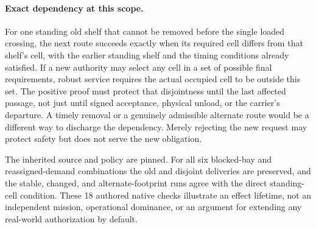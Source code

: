 \documentclass[11pt]{article}
\begin{document}
\paragraph{Exact dependency at this scope.}
For one standing old shelf that cannot be removed before the single
loaded crossing, the next route succeeds exactly when its required
cell differs from that shelf's cell, with the earlier standing shelf and
the timing conditions already satisfied. If a new authority may select
any cell in a set of possible final requirements, robust service requires
the actual occupied cell to be outside this set. The positive proof
must protect that disjointness until the last affected passage, not just
until signed acceptance, physical unload, or the carrier's departure.
A timely removal or a genuinely admissible alternate route would be
a different way to discharge the dependency. Merely rejecting the
new request may protect safety but does not serve the new obligation.

The inherited source and policy are pinned. For all six blocked-bay
and reassigned-demand combinations the old and disjoint deliveries
are preserved, and the stable, changed, and alternate-footprint runs
agree with the direct standing-cell condition. These 18 authored native
checks illustrate an effect lifetime, not an independent mission,
operational dominance, or an argument for extending any real-world
authorization by default.
\end{document}
